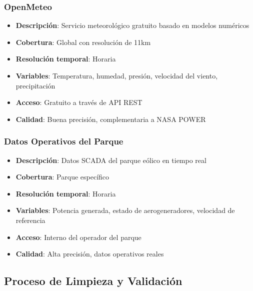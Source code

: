 \documentclass[conference]{IEEEtran}
\begin{document}
	\subsubsection{OpenMeteo}
	\begin{itemize}[leftmargin=*]
		\item \textbf{Descripción}: Servicio meteorológico gratuito basado en modelos numéricos
		\item \textbf{Cobertura}: Global con resolución de 11km
		\item \textbf{Resolución temporal}: Horaria
		\item \textbf{Variables}: Temperatura, humedad, presión, velocidad del viento, precipitación
		\item \textbf{Acceso}: Gratuito a través de API REST
		\item \textbf{Calidad}: Buena precisión, complementaria a NASA POWER
	\end{itemize}
	
	\subsubsection{Datos Operativos del Parque}
	\begin{itemize}[leftmargin=*]
		\item \textbf{Descripción}: Datos SCADA del parque eólico en tiempo real
		\item \textbf{Cobertura}: Parque específico
		\item \textbf{Resolución temporal}: Horaria
		\item \textbf{Variables}: Potencia generada, estado de aerogeneradores, velocidad de referencia
		\item \textbf{Acceso}: Interno del operador del parque
		\item \textbf{Calidad}: Alta precisión, datos operativos reales
	\end{itemize}
	
	\subsection{Proceso de Limpieza y Validación}
	
\end{document}
